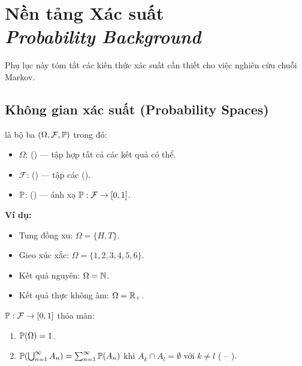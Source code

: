 \chapter{Nền tảng Xác suất\\{\normalsize\textit{Probability Background}}}
\label{ch:probability}

Phụ lục này tóm tắt các kiến thức xác suất cần thiết cho việc nghiên cứu chuỗi Markov.

\section{Không gian xác suất (Probability Spaces)}

\begin{dinhnghia}
 là bộ ba $(\Omega, \mathcal{F}, \mathbb{P})$ trong đó:
\begin{itemize}[nosep]
  \item $\Omega$:  () --- tập hợp tất cả các kết quả có thể.
  \item $\mathcal{F}$:  () --- tập các  ().
  \item $\mathbb{P}$:  () --- ánh xạ $\mathbb{P}: \mathcal{F} \to [0,1]$.
\end{itemize}
\end{dinhnghia}

\textbf{Ví dụ:}
\begin{itemize}[nosep]
  \item Tung đồng xu: $\Omega = \{H, T\}$.
  \item Gieo xúc xắc: $\Omega = \{1, 2, 3, 4, 5, 6\}$.
  \item Kết quả nguyên: $\Omega = \mathbb{N}$.
  \item Kết quả thực không âm: $\Omega = \mathbb{R}_+$.
\end{itemize}

 $\mathbb{P}: \mathcal{F} \to [0,1]$ thỏa mãn:
\begin{enumerate}[nosep]
  \item $\mathbb{P}(\Omega) = 1$.
  \item $\mathbb{P}\!\left(\bigcup_{n=1}^{\infty} A_n\right) = \sum_{n=1}^{\infty} \mathbb{P}(A_n)$ khi $A_k \cap A_l = \emptyset$ với $k \neq l$ ( -- ).
\end{enumerate}

